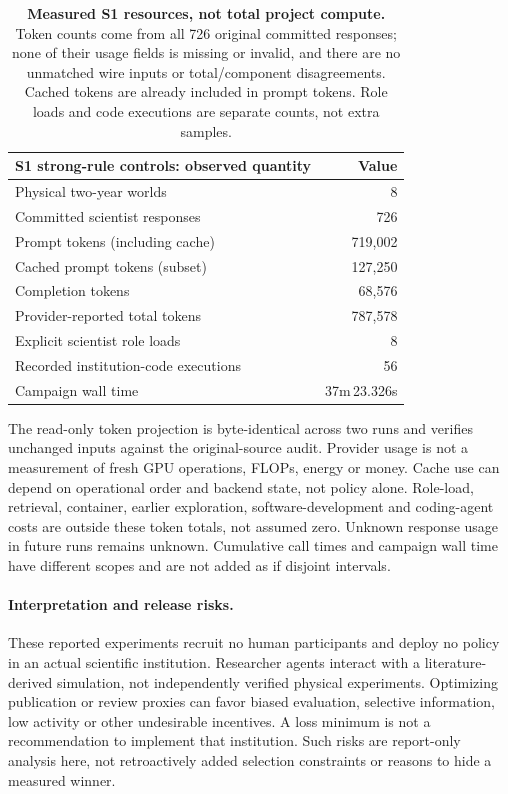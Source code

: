\documentclass{article}
\begin{document}
\begin{table}[h]
\centering\small
\begin{tabular}{@{}lr@{}}
\toprule
S1 strong-rule controls: observed quantity & Value\\
\midrule
Physical two-year worlds & 8\\
Committed scientist responses & 726\\
Prompt tokens (including cache) & 719,002\\
Cached prompt tokens (subset) & 127,250\\
Completion tokens & 68,576\\
Provider-reported total tokens & 787,578\\
Explicit scientist role loads & 8\\
Recorded institution-code executions & 56\\
Campaign wall time & 37m\,23.326s\\
\bottomrule
\end{tabular}
\caption{\textbf{Measured S1 resources, not total project compute.}
Token counts come from all 726 original committed responses; none of their
usage fields is missing or invalid, and there are no unmatched wire inputs or
total/component disagreements. Cached tokens are already included in prompt
tokens. Role loads and code executions are separate counts, not extra samples.}
\label{tab:resources}
\end{table}

The read-only token projection is byte-identical across two runs and verifies
unchanged inputs against the original-source audit. Provider usage is not a
measurement of fresh GPU operations, FLOPs, energy or money. Cache use can depend
on operational order and backend state, not policy alone. Role-load, retrieval,
container, earlier exploration, software-development and coding-agent costs are
outside these token totals, not assumed zero. Unknown response usage in future
runs remains unknown. Cumulative call times and campaign wall time have different
scopes and are not added as if disjoint intervals.

\paragraph{Interpretation and release risks.}
These reported experiments recruit no human participants and deploy no policy
in an actual scientific institution. Researcher agents interact with a
literature-derived simulation, not independently verified physical experiments.
Optimizing publication or review proxies can favor biased evaluation, selective
information, low activity or other undesirable incentives. A loss minimum is not
a recommendation to implement that institution. Such risks are report-only
analysis here, not retroactively added selection constraints or reasons to hide
a measured winner.
\end{document}

